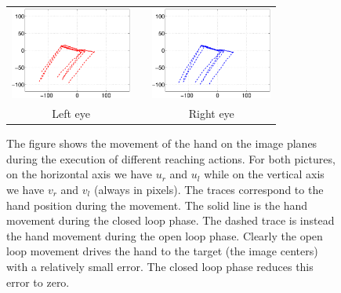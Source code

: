 \begin{figure}
  \begin{center}
	\begin{tabular}{ccc}
	  \parbox{40mm}{\includegraphics[width=40mm]{Figure/LeftEyeOpenClosedLoop.eps}}  & \hspace{2cm} &
	  \parbox{40mm}{\includegraphics[width=40mm]{Figure/RightEyeOpenClosedLoop.eps}}
	  \\
	  \parbox{40mm}{\centering Left eye } & \hspace{2cm} & \parbox{40mm}{\centering Right eye }
  \end{tabular}
\end{center}
\caption{The figure shows the movement of the hand on the image planes 
during the execution of different reaching actions. For both pictures, 
on the horizontal axis 
we have $u_r$ and $u_l$ while on the vertical axis we have $v_r$ and $v_l$ (always in pixels).
The traces correspond to the hand position during the movement. The solid line is the hand movement
during the closed loop phase. The dashed trace is instead the hand movement during the open loop 
phase. Clearly the open loop movement drives the hand to the target (the image centers) with a 
relatively small error. The closed loop phase reduces this error to zero.}\label{Fig:TimeResponseOpenClosedLoopErrors}
  \end{figure}
  

